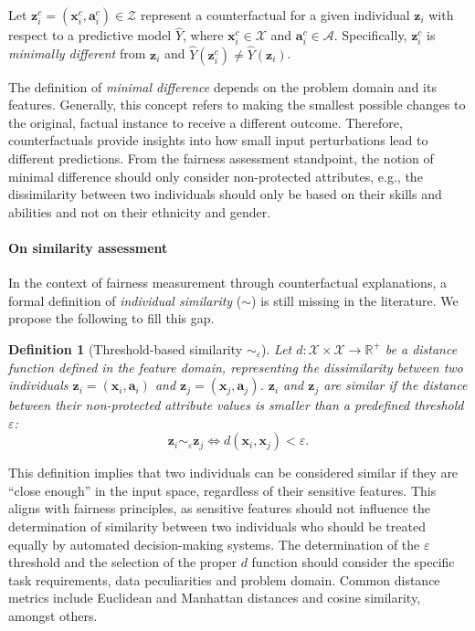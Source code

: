 \documentclass[letterpaper]{article} %
\newtheorem{definition}{Definition}
\begin{document}
Let $\boldsymbol{z}_i^c = (\boldsymbol{x}_i^c, \boldsymbol{a}_i^c) \in \mathcal{Z}$ represent a counterfactual for a given individual $\boldsymbol{z}_i$ with respect to a predictive model $\hat{Y}$, where $\boldsymbol{x}_i^c \in \mathcal{X}$ and $\boldsymbol{a}_i^c \in \mathcal{A}$. Specifically, $\boldsymbol{z}_i^c$ is \emph{minimally different} from $\boldsymbol{z}_i$ and $\hat{Y}(\boldsymbol{z}_i^c) \neq \hat{Y}(\boldsymbol{z}_i)$.

The definition of \emph{minimal difference} depends on the problem domain and its features. Generally, this concept refers to making the smallest possible changes to the original, factual instance to receive a different outcome. Therefore, counterfactuals provide insights into how small input perturbations lead to different predictions. From the fairness assessment standpoint, the notion of minimal difference should only consider non-protected attributes, e.g., the dissimilarity between two individuals should only be based on their skills and abilities and not on their ethnicity and gender.

\paragraph{On similarity assessment}

In the context of fairness measurement through counterfactual explanations, a formal definition of \emph{individual similarity} ($\sim$) is still missing in the literature. We propose the following to fill this gap.
%
\begin{definition}[Threshold-based similarity $\sim_\varepsilon$]\label{similar_individuals}
	Let $d: \mathcal{X} \times \mathcal{X} \rightarrow \mathbb{R}^{+}$ be a distance function defined in the feature domain, representing the dissimilarity between two individuals $\boldsymbol{z}_i = (\boldsymbol{x}_i, \boldsymbol{a}_i)$ and $\boldsymbol{z}_j = (\boldsymbol{x}_j, \boldsymbol{a}_j)$.
	$\boldsymbol{z}_i$ and $\boldsymbol{z}_j$ are similar if the distance between their non-protected attribute values is smaller than a predefined threshold $\varepsilon$:
	$$ \boldsymbol{z}_i \sim_\varepsilon \boldsymbol{z}_j \iff d(\boldsymbol{x}_i, \boldsymbol{x}_j) < \varepsilon. $$
\end{definition}
%
\noindent This definition implies that two individuals can be considered similar if they are ``close enough'' in the input space, regardless of their sensitive features. This aligns with fairness principles, as sensitive features should not influence the determination of similarity between two individuals who should be treated equally by automated decision-making systems.
%
The determination of the $\varepsilon$ threshold and the selection of the proper $d$ function should consider the specific task requirements, data peculiarities and problem domain. Common distance metrics include Euclidean and Manhattan distances and cosine similarity, amongst others.
\end{document}
